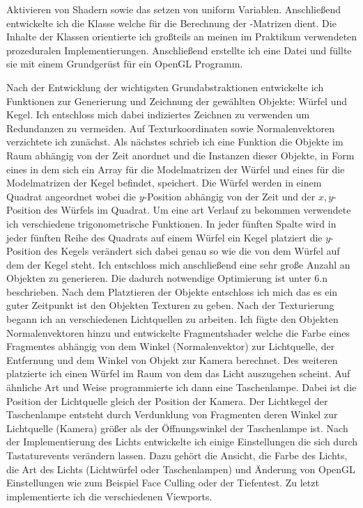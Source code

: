 \documentclass{article}
\begin{document}
Aktivieren von Shadern sowie das setzen von uniform Variablen. Anschließend entwickelte ich die Klasse  welche
für die Berechnung der -Matrizen dient. Die Inhalte der Klassen orientierte ich großteils an meinen im Praktikum
verwendeten prozeduralen Implementierungen. Anschließend erstellte ich eine  Datei und füllte sie mit einem
Grundgerüst für ein OpenGL Programm.\par
\medskip
Nach der Entwicklung der wichtigsten Grundabstraktionen entwickelte ich Funktionen zur Generierung und Zeichnung
der gewählten Objekte: Würfel und Kegel. Ich entschloss mich dabei indiziertes Zeichnen zu verwenden um Redundanzen zu
vermeiden. Auf Texturkoordinaten sowie Normalenvektoren verzichtete ich zunächst. Als nächstes schrieb ich eine
Funktion die Objekte im Raum abhängig von der Zeit anordnet und die Instanzen dieser Objekte, in Form eines 
in dem sich ein Array für die Modelmatrizen der Würfel und eines für die Modelmatrizen der Kegel befindet, speichert.
Die Würfel werden in einem Quadrat angeordnet wobei die $y$-Position abhängig von der Zeit und der $x,y$-Position des
Würfels im Quadrat. Um eine art Verlauf zu bekommen verwendete ich verschiedene trigonometrische Funktionen.
In jeder fünften Spalte wird in jeder fünften Reihe des Quadrats auf einem Würfel ein Kegel platziert
die $y$-Position des Kegels verändert sich dabei genau so wie die von dem Würfel auf dem der Kegel steht.
Ich entschloss mich anschließend eine sehr große Anzahl an Objekten zu generieren. Die dadurch notwendige Optimierung
ist unter 6.n beschrieben. Nach dem Platztieren der Objekte entschloss ich mich das es ein guter Zeitpunkt ist 
den Objekten Texturen zu geben. Nach der Texturierung begann ich an verschiedenen Lichtquellen zu arbeiten.
Ich fügte den Objekten Normalenvektoren hinzu und entwickelte Fragmentshader welche die Farbe eines Fragmentes
abhängig von dem Winkel (Normalenvektor) zur Lichtquelle, der Entfernung und dem Winkel von Objekt zur Kamera berechnet.
Des weiteren platzierte ich einen Würfel im Raum von dem das Licht auszugehen scheint.
Auf ähnliche Art und Weise programmierte ich dann eine Taschenlampe.
Dabei ist die Position der Lichtquelle gleich der Position der Kamera. Der Lichtkegel der 
Taschenlampe entsteht durch Verdunklung von Fragmenten deren Winkel zur Lichtquelle (Kamera) größer als der Öffnungswinkel
der Taschenlampe ist. Nach der Implementierung des Lichts entwickelte ich einige Einstellungen die sich durch
Tastaturevents verändern lassen. Dazu gehört die Ansicht, die Farbe des Lichts, die Art des Lichts
(Lichtwürfel oder Taschenlampen) und Änderung von OpenGL Einstellungen wie zum Beispiel Face Culling oder der Tiefentest.
Zu letzt implementierte ich die verschiedenen Viewports.
\end{document}
